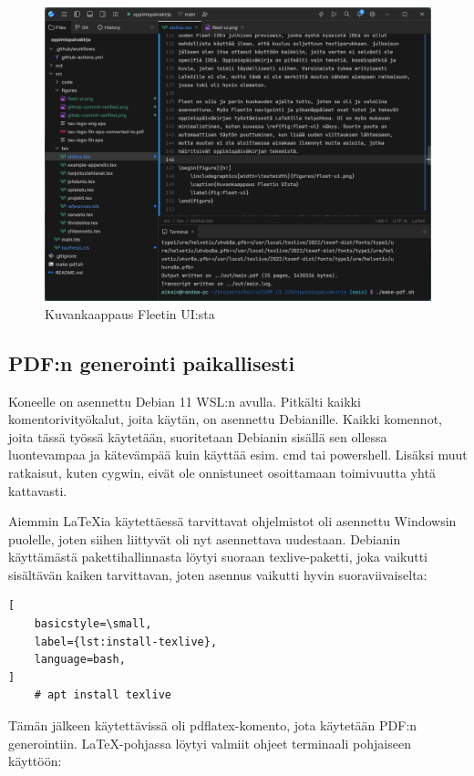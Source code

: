 \begin{figure}[h!]
    \includegraphics[width=\textwidth]{figures/fleet-ui.png}
    \caption{Kuvankaappaus Fleetin UI:sta}
    \label{fig:fleet-ui}
\end{figure}

\subsection{PDF:n generointi paikallisesti}

Koneelle on asennettu Debian 11 WSL:n avulla. Pitkälti kaikki
komentorivityökalut, joita käytän, on asennettu Debianille. Kaikki komennot,
joita tässä työssä käytetään, suoritetaan Debianin sisällä sen ollessa
luontevampaa ja kätevämpää kuin käyttää esim. cmd tai powershell. Lisäksi muut
ratkaisut, kuten cygwin, eivät ole onnistuneet osoittamaan toimivuutta yhtä
kattavasti.

Aiemmin LaTeXia käytettäessä tarvittavat ohjelmistot oli asennettu Windowsin
puolelle, joten siihen liittyvät oli nyt asennettava uudestaan. Debianin
käyttämästä pakettihallinnasta löytyi suoraan texlive-paketti, joka vaikutti
sisältävän kaiken tarvittavan, joten asennus vaikutti hyvin suoraviivaiselta:

\begin{lstlisting}[
    basicstyle=\small,
    label={lst:install-texlive},
    language=bash,
]
    # apt install texlive
\end{lstlisting}

Tämän jälkeen käytettävissä oli pdflatex-komento, jota käytetään PDF:n
generointiin. LaTeX-pohjassa löytyi valmiit ohjeet terminaali pohjaiseen
käyttöön:

